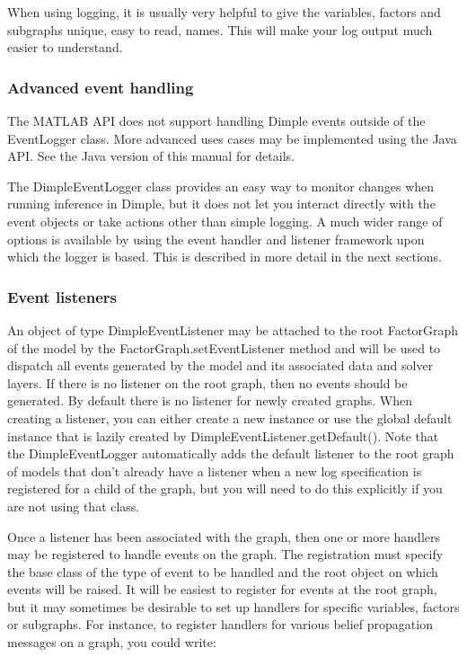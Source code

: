 When using logging, it is usually very helpful to give the variables, factors and
subgraphs unique, easy to read, names. This will make your log output much easier to understand.

\subsubsection{Advanced event handling}

\ifmatlab
The MATLAB API does not support handling Dimple events outside of the EventLogger
class. More advanced uses cases may be implemented using the Java API. See the Java version of this manual for details.
\fi

\ifjava
The DimpleEventLogger class provides an easy way to monitor changes when
running inference in Dimple, but it does not let you interact directly with 
the event objects or take actions other than simple logging. A much wider range of
options is available by using the event handler and listener framework upon which the
logger is based. This is described in more detail in the next sections.

\subsubsection{Event listeners}
An object of type DimpleEventListener may be attached to the root FactorGraph of the model by the FactorGraph.setEventListener method and will be used to dispatch all events generated by the model and its associated data and solver layers. If there is no listener on the root graph, then no events should be generated. By default there is no listener for newly created graphs. When creating a listener, you can either create a new instance or use the global default instance that is lazily created by DimpleEventListener.getDefault(). Note that the DimpleEventLogger automatically adds the default listener to the root graph of models that don't already have a listener when a new log specification is registered for a child of the graph, but you will need to do this explicitly if you are not using that class.

Once a listener has been associated with the graph, then one or more handlers may be registered to handle events on the graph. The registration must specify the base class of the type of event to be handled and the root object on which events will be raised. It will be easiest to register for events at the root graph, but it may sometimes be desirable to set up handlers for specific variables, factors or subgraphs. For instance, to register handlers for various belief propagation messages on a graph, you could write: 

